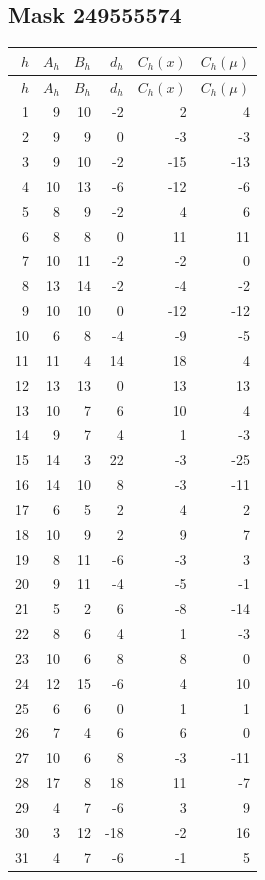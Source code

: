 \documentclass[11pt]{article}
\begin{document}
\subsection{Mask 249555574}
\begin{center}\scriptsize
\begin{longtable}{r r r r r r}
\toprule $h$ & $A_h$ & $B_h$ & $d_h$ & $C_h(x)$ & $C_h(\mu)$\\
\midrule\endfirsthead
\toprule $h$ & $A_h$ & $B_h$ & $d_h$ & $C_h(x)$ & $C_h(\mu)$\\
\midrule\endhead
1 & 9 & 10 & -2 & 2 & 4\\
2 & 9 & 9 & 0 & -3 & -3\\
3 & 9 & 10 & -2 & -15 & -13\\
4 & 10 & 13 & -6 & -12 & -6\\
5 & 8 & 9 & -2 & 4 & 6\\
6 & 8 & 8 & 0 & 11 & 11\\
7 & 10 & 11 & -2 & -2 & 0\\
8 & 13 & 14 & -2 & -4 & -2\\
9 & 10 & 10 & 0 & -12 & -12\\
10 & 6 & 8 & -4 & -9 & -5\\
11 & 11 & 4 & 14 & 18 & 4\\
12 & 13 & 13 & 0 & 13 & 13\\
13 & 10 & 7 & 6 & 10 & 4\\
14 & 9 & 7 & 4 & 1 & -3\\
15 & 14 & 3 & 22 & -3 & -25\\
16 & 14 & 10 & 8 & -3 & -11\\
17 & 6 & 5 & 2 & 4 & 2\\
18 & 10 & 9 & 2 & 9 & 7\\
19 & 8 & 11 & -6 & -3 & 3\\
20 & 9 & 11 & -4 & -5 & -1\\
21 & 5 & 2 & 6 & -8 & -14\\
22 & 8 & 6 & 4 & 1 & -3\\
23 & 10 & 6 & 8 & 8 & 0\\
24 & 12 & 15 & -6 & 4 & 10\\
25 & 6 & 6 & 0 & 1 & 1\\
26 & 7 & 4 & 6 & 6 & 0\\
27 & 10 & 6 & 8 & -3 & -11\\
28 & 17 & 8 & 18 & 11 & -7\\
29 & 4 & 7 & -6 & 3 & 9\\
30 & 3 & 12 & -18 & -2 & 16\\
31 & 4 & 7 & -6 & -1 & 5\\

\end{longtable}
\end{center}
\end{document}
